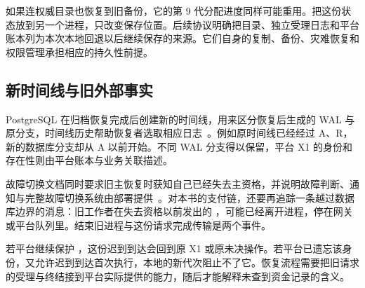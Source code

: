 如果连权威目录也恢复到旧备份，它的第 9 代分配进度同样可能重用。把这份状态放到另一个进程，只改变保存位置。后续协议明确把目录、独立受理日志和平台账本列为本次本地回退以后继续保存的来源。它们自身的复制、备份、灾难恢复和权限管理承担相应的持久性前提。

\subsection*{新时间线与旧外部事实}

PostgreSQL 在归档恢复完成后创建新的时间线，用来区分恢复后生成的 WAL 与原分支，时间线历史帮助恢复者选取相应日志~\cite{pg18-recovery}。例如原时间线已经经过 A、R，新的数据库分支却从 A 以前开始。不同 WAL 分支得以保留，平台 X1 的身份和存在性则由平台账本与业务关联描述。


故障切换文档同时要求旧主恢复时获知自己已经失去主资格，并说明故障判断、通知与完整故障切换系统由部署提供~\cite{pg18-failover}。对本书的支付链，还要再追踪一条越过数据库边界的消息：旧工作者在失去资格以前发出的 ，可能已经离开进程，停在网关或平台队列里。结束旧进程与这份请求完成传输是两个事件。

若平台继续保护 ，这份迟到到达会回到原 X1 或原未决操作。若平台已遗忘该身份，又允许迟到到达首次执行，本地的新代次阻止不了它。恢复流程需要把旧请求的受理与终结接到平台实际提供的能力，随后才能解释未查到资金记录的含义。
\FloatBarrier
